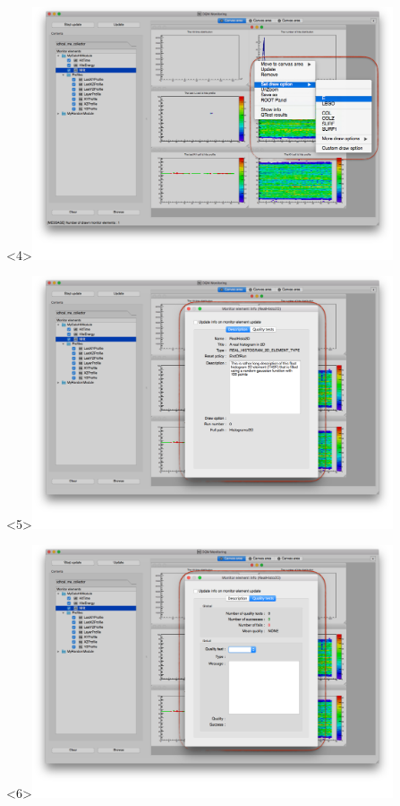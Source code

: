 \documentclass[8pt]{beamer}
\begin{document}
\begin{frame}
\begin{overlayarea}{\textwidth}{\textheight}
\begin{center}
         \begin{onlyenv}<4>\includegraphics[width=0.8\textwidth]{figs/MonitoringGui/MG_HistosMenu}\end{onlyenv}
         \begin{onlyenv}<5>\includegraphics[width=0.8\textwidth]{figs/MonitoringGui/MG_HistoInfo}\end{onlyenv}
         \begin{onlyenv}<6>\includegraphics[width=0.8\textwidth]{figs/MonitoringGui/MG_HistoQuality}\end{onlyenv}

\end{center}
\end{overlayarea}
\end{frame}
\end{document}
